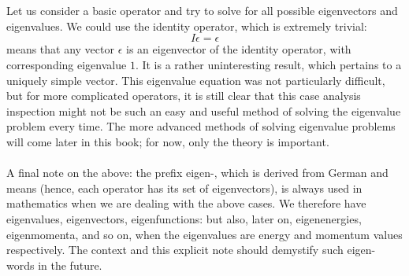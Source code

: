 \\\\
Let us consider a basic operator and try to solve for all possible eigenvectors and eigenvalues. We could use the identity operator, which is extremely trivial:
$$
I\epsilon = \epsilon
$$ means that any vector $\epsilon$ is an eigenvector of the identity operator, with corresponding eigenvalue $1$. It is a rather uninteresting result, which pertains to a uniquely simple vector. This eigenvalue equation was not particularly difficult, but for more complicated operators, it is still clear that this case analysis inspection might not be such an easy and useful method of solving the eigenvalue problem every time. The more advanced methods of solving eigenvalue problems will come later in this book; for now, only the theory is important.
\\\\
A final note on the above: the prefix eigen-, which is derived from German and means  (hence, each operator has its  set of eigenvectors), is always used in mathematics when we are dealing with the above cases. We therefore have eigenvalues, eigenvectors, eigenfunctions: but also, later on, eigenenergies, eigenmomenta, and so on, when the eigenvalues are energy and momentum values respectively. The context and this explicit note should demystify such eigen- words in the future.
